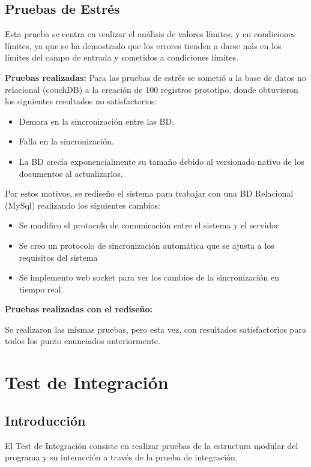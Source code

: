 	\subsection{Pruebas de Estrés}

		Esta prueba se centra en realizar el análisis de valores límites, y en condiciones límites, ya que se ha demostrado que los errores tienden a darse más en los límites del campo de entrada y sometidos a condiciones límites.

		\newpage
		\textbf{Pruebas realizadas:}
		Para las pruebas de estrés se sometió a la base de datos no relacional (couchDB) a la creación de 100 registros prototipo, donde obtuvieron los siguientes resultados no satisfactorios:
		\begin{itemize}
			\item Demora en la sincronización entre las BD.
			\item Falla en la sincronización.
			\item La BD crecía exponencialmente su tamaño debido al versionado nativo de los documentos al actualizarlos.
		\end{itemize}
		Por estos motivos, se rediseño el sistema para trabajar con una BD Relacional (MySql) realizando los siguientes cambios:
		\begin{itemize}
			\item Se modifico el protocolo de comunicación entre el sistema y el servidor
			\item Se creo un protocolo de sincronización automática que se ajusta a los requisitos del sistema
			\item Se implemento web socket para ver los cambios de la sincronización en tiempo real.
		\end{itemize}
		
		\textbf{Pruebas realizadas con el rediseño:}

		Se realizaron las mismas pruebas, pero esta vez, con resultados satisfactorios para todos los punto enunciados anteriormente.


\section{Test de Integración}

	\subsection{Introducción}

		El Test de Integración consiste en realizar pruebas de la estructura modular del programa y su interacción a través de la prueba de integración.

